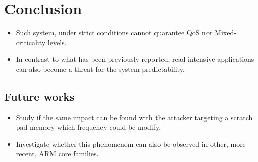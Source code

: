 \section{Conclusion}
    \begin{itemize}
        \item Such system, under strict conditions cannot quarantee QoS nor Mixed-criticality levels.
        \item In contrast to what has been previously reported, read intensive applications can also become a threat for the system predictability.
    \end{itemize}
    \subsection{Future works}
        \begin{itemize}
            \item Study if the same impact can be found with the attacker targeting a scratch pad memory which frequency could be modify.
            \item Investigate whether this phenomenom can also be observed in other, more recent, ARM core families.
        \end{itemize}
